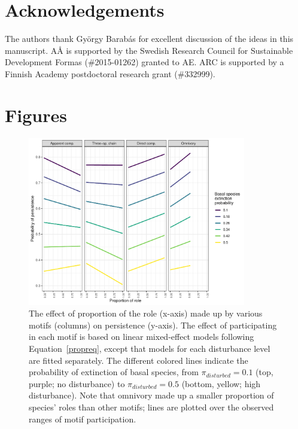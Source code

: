 \documentclass[12pt]{article}
\begin{document}
\begin{spacing}{2.0}
\section*{Acknowledgements}

    The authors thank György Barabás for excellent discussion of the ideas in this manuscript. AÅ is supported by the Swedish Research Council for Sustainable Development Formas (\#2015-01262) granted to AE. ARC is supported by a Finnish Academy postdoctoral research grant (\#332999).

\clearpage    

\section*{Figures}
    
            
    \begin{figure}[hb!]
        \centering
        \includegraphics[width=0.85\textwidth]{figures/prop_lmer_allCS.pdf}
        \caption{The effect of proportion of the role (x-axis) made up by various motifs (columns) on persistence (y-axis). The effect of participating in each motif is based on linear mixed-effect models following Equation~\ref{propreq}, except that models for each  disturbance level are fitted separately. The different colored lines indicate the probability of extinction of basal species, from $\pi_{disturbed} = 0.1$ (top, purple; no disturbance) to $\pi_{disturbed} = 0.5$ (bottom, yellow; high disturbance). Note that omnivory made up a smaller proportion of species' roles than other motifs; lines are plotted over the observed ranges of motif participation.}
    \label{fig:prop_lmer_all}
    \end{figure}
        


\end{spacing}
\end{document}
